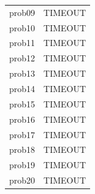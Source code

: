 \begin{table}[H]
{\begin{tabular}{lrrr rr rr rr rrrrr}
            prob09           & \multicolumn{14}{c}{TIMEOUT}                                                                                                                                  \\
            prob10           & \multicolumn{14}{c}{TIMEOUT}                                                                                                                                  \\
            prob11           & \multicolumn{14}{c}{TIMEOUT}                                                                                                                                  \\
            prob12           & \multicolumn{14}{c}{TIMEOUT}                                                                                                                                  \\
            prob13           & \multicolumn{14}{c}{TIMEOUT}                                                                                                                                  \\
            prob14           & \multicolumn{14}{c}{TIMEOUT}                                                                                                                                  \\
            prob15           & \multicolumn{14}{c}{TIMEOUT}                                                                                                                                  \\
            prob16           & \multicolumn{14}{c}{TIMEOUT}                                                                                                                                  \\
            prob17           & \multicolumn{14}{c}{TIMEOUT}                                                                                                                                  \\
            prob18           & \multicolumn{14}{c}{TIMEOUT}                                                                                                                                  \\
            prob19           & \multicolumn{14}{c}{TIMEOUT}                                                                                                                                  \\
            prob20           & \multicolumn{14}{c}{TIMEOUT}                                                                                                                                  \\

\end{tabular}}
\end{table}

